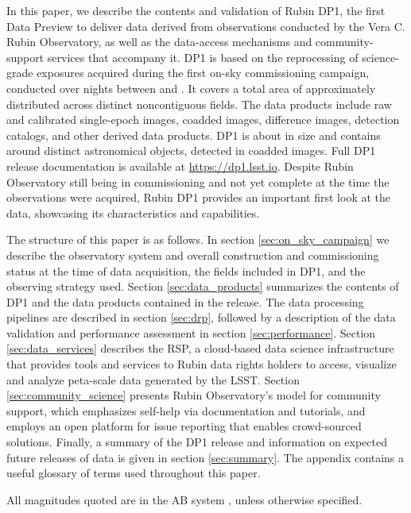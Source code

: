 In this paper, we describe the contents and validation of Rubin \gls{DP1}, the first Data Preview to deliver data derived from observations conducted by the Vera C. Rubin Observatory, as well as the data-access mechanisms and community-support services that accompany it. 
\gls{DP1} is based on the reprocessing of \nexposures science-grade exposures acquired during the first on-sky commissioning campaign, conducted over \nnightscomcam nights between \campaignstartdate and \dponeenddate.
It covers a  total area of approximately \totalarea distributed across \nfields distinct noncontiguous fields.
The data products include raw and calibrated single-\gls{epoch} images, coadded images, difference images, detection catalogs, and other derived data products.
\gls{DP1} is about \sizeinbytes in size and contains around \nobjects distinct astronomical objects, detected in \ndeepcoadds coadded images.
Full \gls{DP1} release documentation is available at \url{https://dp1.lsst.io}.
Despite Rubin Observatory still being in commissioning and not yet complete at the time the observations were acquired, Rubin \gls{DP1} provides an important first look at the data, showcasing its characteristics and capabilities.

The structure of this paper is as follows.
In section \ref{sec:on_sky_campaign} we describe the observatory system and overall construction and commissioning status at the time of data acquisition, the \nfields fields included in \gls{DP1}, and the observing strategy used.
Section \ref{sec:data_products} summarizes the contents of \gls{DP1} and the data products contained in the release.
The data processing pipelines are described in section \ref{sec:drp}, followed by a description of the data validation and performance assessment in section \ref{sec:performance}.
Section \ref{sec:data_services} describes the \gls{RSP}, a \gls{cloud}-based data science infrastructure that provides tools and services to Rubin data rights holders to access, visualize and analyze peta-scale data generated by the \gls{LSST}.
Section \ref{sec:community_science} presents Rubin Observatory's model for community support, which emphasizes self-help via documentation and tutorials, and employs an open platform for issue reporting that enables crowd-sourced solutions.
Finally, a summary of the \gls{DP1} release and information on expected future releases of data is given in section \ref{sec:summary}.
The appendix contains a useful glossary of terms used throughout this paper.

All magnitudes quoted are in the AB system \citep{1983ApJ...266..713O}, unless otherwise specified.